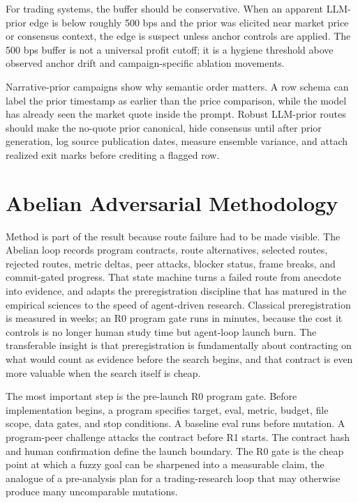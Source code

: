 \documentclass[11pt]{article}
\begin{document}
For trading systems, the buffer should be conservative. When an apparent LLM-prior edge is below roughly 500 bps and the prior was elicited near market price or consensus context, the edge is suspect unless anchor controls are applied. The 500 bps buffer is not a universal profit cutoff; it is a hygiene threshold above observed anchor drift and campaign-specific ablation movements.

Narrative-prior campaigns show why semantic order matters. A row schema can label the prior timestamp as earlier than the price comparison, while the model has already seen the market quote inside the prompt. Robust LLM-prior routes should make the no-quote prior canonical, hide consensus until after prior generation, log source publication dates, measure ensemble variance, and attach realized exit marks before crediting a flagged row.

\section{Abelian Adversarial Methodology}

Method is part of the result because route failure had to be made visible. The Abelian loop records program contracts, route alternatives, selected routes, rejected routes, metric deltas, peer attacks, blocker status, frame breaks, and commit-gated progress. That state machine turns a failed route from anecdote into evidence, and adapts the preregistration discipline that has matured in the empirical sciences \citep{Nosek2018Preregistration,Munafo2017Manifesto} to the speed of agent-driven research. Classical preregistration is measured in weeks; an R0 program gate runs in minutes, because the cost it controls is no longer human study time but agent-loop launch burn. The transferable insight is that preregistration is fundamentally about contracting on what would count as evidence before the search begins, and that contract is even more valuable when the search itself is cheap.

The most important step is the pre-launch R0 program gate. Before implementation begins, a program specifies target, eval, metric, budget, file scope, data gates, and stop conditions. A baseline eval runs before mutation. A program-peer challenge attacks the contract before R1 starts. The contract hash and human confirmation define the launch boundary. The R0 gate is the cheap point at which a fuzzy goal can be sharpened into a measurable claim, the analogue of a pre-analysis plan for a trading-research loop that may otherwise produce many uncomparable mutations.
\end{document}
